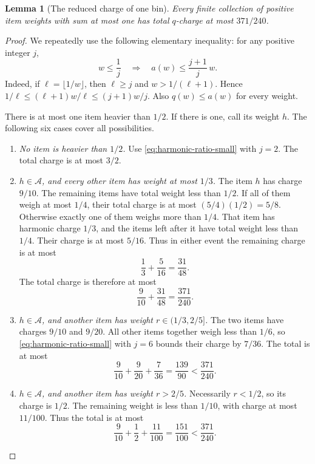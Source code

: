 \documentclass[11pt]{article}
\newtheorem{lemma}[theorem]{Lemma}
\theoremstyle{definition}\newtheorem{algorithm}{Algorithm}[section]
\numberwithin{equation}{section}
\theoremstyle{remark}\newtheorem*{remark}{Remark}
\begin{document}
\begin{lemma}[The reduced charge of one bin]\label{lem:discounted-charge}
Every finite collection of positive item weights with sum at most one has total
$q$-charge at most $371/240$.
\end{lemma}
\begin{proof}
We repeatedly use the following elementary inequality: for any positive
integer $j$,
\begin{equation}
 w\le\frac1j\quad\Longrightarrow\quad
 a(w)\le\frac{j+1}{j}\,w.
 \label{eq:harmonic-ratio-small}
\end{equation}
Indeed, if $\ell=\lfloor1/w\rfloor$, then $\ell\ge j$ and
$w>1/(\ell+1)$. Hence
$1/\ell\le(\ell+1)w/\ell\le(j+1)w/j$.
Also $q(w)\le a(w)$ for every weight.

There is at most one item heavier than $1/2$. If there is one, call its
weight $h$. The following six cases cover all possibilities.
\begin{enumerate}
\item
\textit{No item is heavier than $1/2$.}
Use \eqref{eq:harmonic-ratio-small} with $j=2$. The total charge is at
most $3/2$.

\item
\textit{$h\in\mathcal A$, and every other item has weight at most $1/3$.}
The item $h$ has charge $9/10$. The remaining items have total weight
less than $1/2$. If all of them weigh at most $1/4$, their total charge
is at most $(5/4)(1/2)=5/8$.
Otherwise exactly one of them weighs more than $1/4$. That item has
harmonic charge $1/3$, and the items left after it have total weight less
than $1/4$. Their charge is at most $5/16$. Thus in either event the
remaining charge is at most
\[
 \frac13+\frac5{16}=\frac{31}{48}.
\]
The total charge is therefore at most
\[
 \frac9{10}+\frac{31}{48}=\frac{371}{240}.
\]

\item
\textit{$h\in\mathcal A$, and another item has weight
$r\in(1/3,2/5]$.}
The two items have charges $9/10$ and $9/20$. All other items together
weigh less than $1/6$, so \eqref{eq:harmonic-ratio-small} with $j=6$
bounds their charge by $7/36$. The total is at most
\[
 \frac9{10}+\frac9{20}+\frac7{36}
 =\frac{139}{90}<\frac{371}{240}.
\]

\item
\textit{$h\in\mathcal A$, and another item has weight $r>2/5$.}
Necessarily $r<1/2$, so its charge is $1/2$. The remaining weight is less
than $1/10$, with charge at most $11/100$. Thus the total is at most
\[
 \frac9{10}+\frac12+\frac{11}{100}
 =\frac{151}{100}<\frac{371}{240}.
\]


\end{enumerate}
\end{proof}
\end{document}
